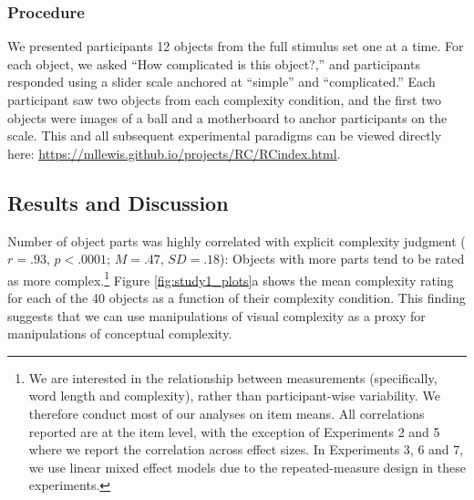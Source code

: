 \subsubsection{Procedure}
We presented participants 12 objects from the full stimulus set one at a time. For each object, we asked ``How complicated is this object?,'' and participants responded using a slider scale anchored at ``simple'' and ``complicated.'' Each participant saw two objects from each complexity condition, and the first two objects were images of a ball and a motherboard to anchor participants on the scale. This and all subsequent experimental paradigms can be viewed directly here: \url{https://mllewis.github.io/projects/RC/RCindex.html}.

\subsection{Results and Discussion}
Number of object parts was highly correlated with explicit complexity judgment ($r = .93$, $p < .0001$; $M = .47$, $SD = .18$): Objects with more parts tend to be rated as more complex.\footnote{We are interested in the relationship between measurements (specifically, word length and complexity), rather than participant-wise variability. We therefore conduct most of our analyses on item means. All correlations reported are at the item level, with the exception of Experiments 2 and 5 where we report the correlation across effect sizes. In Experiments 3, 6 and 7, we use linear mixed effect models due to the repeated-measure design in these experiments.} Figure \ref{fig:study1_plots}a shows the mean complexity rating for each of the 40 objects as a function of their complexity condition. This finding suggests that we can use manipulations of visual complexity as a proxy for manipulations of conceptual complexity.

